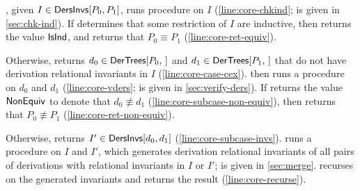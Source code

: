 \verifyaux, given $I \in \mathsf{DersInvs}[ P_0, P_1 ]$, runs procedure
\chkinductive on $I$ (\autoref{line:core-chkind};
%
\chkinductive is given in \autoref{sec:chk-ind}).
%
If \chkinductive determines that some restriction of $I$ are
inductive, then \chkinductive returns the value $\mathsf{IsInd}$, and
\verifyaux returns that $P_0 \equiv P_1$
(\autoref{line:core-ret-equiv}).

Otherwise, \chkinductive returns $d_0 \in \dertrees{ P_0 }$ and $d_1
\in \dertrees{ P_1 }$ that do not have derivation relational
invariants in $I$ (\autoref{line:core-case-cex}).
%
\verifyaux then runs a procedure \verifyders on $d_0$ and $d_1$
(\autoref{line:core-vders}; \verifyders is given in
\autoref{sec:verify-ders}).
%
If \verifyders returns the value $\mathsf{NonEquiv}$ to denote that $d_0
\not\equiv d_1$ (\autoref{line:core-subcase-non-equiv}), then
\verifyaux returns that $P_0 \not\equiv P_1$
(\autoref{line:core-ret-non-equiv}).

Otherwise, \verifyders returns $I' \in \mathsf{DersInvs}[ d_0, d_1 ]$
(\autoref{line:core-subcase-invs}).
%
\verifyaux runs a procedure \mergeinvs on $I$ and $I'$, which
generates derivation relational invariants of all pairs of derivations
with relational invariants in $I$ or $I'$;
%
\mergeinvs is given in \autoref{sec:merge}.
%
\verifyaux recurses on the generated invariants and returns the result
(\autoref{line:core-recurse}).

